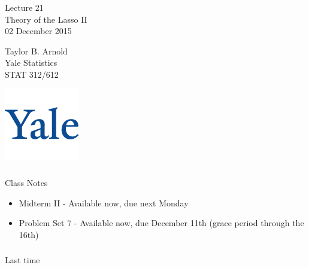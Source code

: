 



\begin{frame}[fragile] \frametitle{}

\vfill

{\fontsize{0.7cm}{0cm}\selectfont Lecture 21 \\\vspace{0.2cm}
Theory of the Lasso II}\\\vspace{0.5cm}
02 December 2015

\vspace{2cm}

\begin{minipage}{0.6\textwidth}
Taylor B. Arnold \\
Yale Statistics  \\
STAT 312/612
\end{minipage}
\hfill
\begin{minipage}{0.3\textwidth}\raggedleft
\includegraphics[scale=0.3]{../yale-logo.png}
\end{minipage}%

\end{frame}

\begin{frame}[fragile] \frametitle{}

{\color{yaleblue}\fontsize{16pt}{20pt}\selectfont Class Notes}

\begin{itemize}
\item Midterm II - Available now, due next Monday
\item Problem Set 7 - Available now, due December 11th (grace period through the 16th)
\end{itemize}

\end{frame}

\begin{frame}[fragile] \frametitle{}

\begin{flushright}
{\color{yaleblue}\sc\fontsize{1cm}{0cm}\selectfont Last time}
\end{flushright}

\end{frame}

